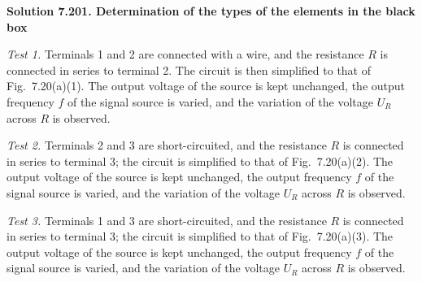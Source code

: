 \textbf{Solution 7.20}\quad \textbf{1. Determination of the types of the elements in the black box}

\emph{Test 1.} Terminals 1 and 2 are connected with a wire, and the resistance $R$ is connected in series to terminal 2. The circuit is then simplified to that of Fig.~7.20(a)(1). The output voltage of the source is kept unchanged, the output frequency $f$ of the signal source is varied, and the variation of the voltage $U_R$ across $R$ is observed.

\emph{Test 2.} Terminals 2 and 3 are short-circuited, and the resistance $R$ is connected in series to terminal 3; the circuit is simplified to that of Fig.~7.20(a)(2). The output voltage of the source is kept unchanged, the output frequency $f$ of the signal source is varied, and the variation of the voltage $U_R$ across $R$ is observed.

\emph{Test 3.} Terminals 1 and 3 are short-circuited, and the resistance $R$ is connected in series to terminal 3; the circuit is simplified to that of Fig.~7.20(a)(3). The output voltage of the source is kept unchanged, the output frequency $f$ of the signal source is varied, and the variation of the voltage $U_R$ across $R$ is observed.

